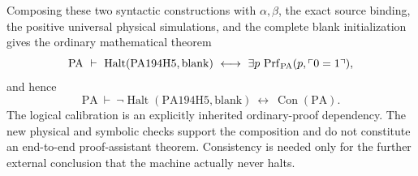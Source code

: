 Composing these two syntactic constructions with $\alpha,\beta$, the exact
source binding, the positive universal physical simulations, and the
complete blank initialization gives the ordinary mathematical theorem
\[
 \mathrm{PA}\ \vdash\
 \operatorname{Halt}(\mathrm{PA194H5},\mathrm{blank})
 \ \longleftrightarrow\
 \exists p\,\operatorname{Prf}_{\rm PA}(p,\ulcorner0=1\urcorner),
\]
and hence
\[
 \mathrm{PA}\ \vdash\
 \neg\operatorname{Halt}(\mathrm{PA194H5},\mathrm{blank})
 \ \longleftrightarrow\ \operatorname{Con}(\mathrm{PA}).
\]
The logical calibration is an explicitly inherited ordinary-proof dependency.
The new physical and symbolic checks support the composition and do not
constitute an end-to-end proof-assistant theorem.  Consistency is needed only
for the further external conclusion that the machine actually never halts.
